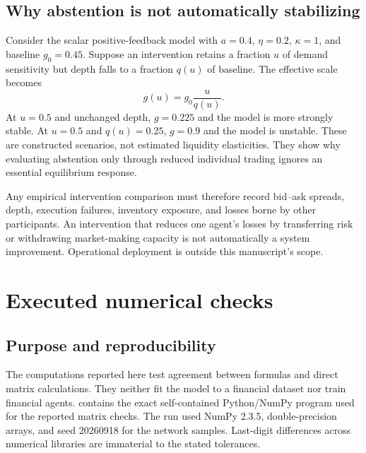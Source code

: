\documentclass[11pt,a4paper]{article}
\theoremstyle{definition}
\theoremstyle{remark}
\begin{document}
\subsection{Why abstention is not automatically stabilizing}
Consider the scalar positive-feedback model with $a=0.4$, $\eta=0.2$, $\kappa=1$, and baseline $g_0=0.45$. Suppose an intervention retains a fraction $u$ of demand sensitivity but depth falls to a fraction $q(u)$ of baseline. The effective scale becomes
\begin{equation}
 g(u)=g_0\frac{u}{q(u)}.
 \label{eq:gatedepth}
\end{equation}
At $u=0.5$ and unchanged depth, $g=0.225$ and the model is more strongly stable. At $u=0.5$ and $q(u)=0.25$, $g=0.9$ and the model is unstable. These are constructed scenarios, not estimated liquidity elasticities. They show why evaluating abstention only through reduced individual trading ignores an essential equilibrium response.

Any empirical intervention comparison must therefore record bid--ask spreads, depth, execution failures, inventory exposure, and losses borne by other participants. An intervention that reduces one agent's losses by transferring risk or withdrawing market-making capacity is not automatically a system improvement. Operational deployment is outside this manuscript's scope.

\section{Executed numerical checks}
\label{sec:checks}
\subsection{Purpose and reproducibility}
The computations reported here test agreement between formulas and direct matrix calculations. They neither fit the model to a financial dataset nor train financial agents.  contains the exact self-contained Python/NumPy program used for the reported matrix checks. The run used NumPy 2.3.5, double-precision arrays, and seed 20260918 for the network samples. Last-digit differences across numerical libraries are immaterial to the stated tolerances.
\end{document}
